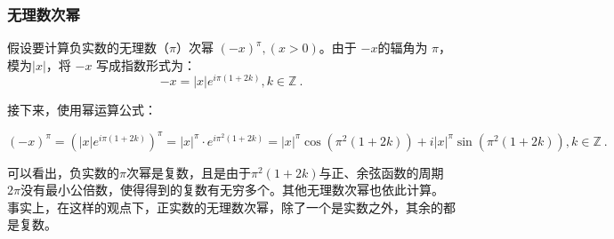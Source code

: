 \subsubsection{无理数次幂}

假设要计算负实数的无理数（$\pi$）次幂 $(-x)^\pi,(x>0)$。由于 $-x$的辐角为 $\pi$，模为$|x|$，将 $-x$ 写成指数形式为：
\begin{equation}
-x = |x| e^{i\pi(1+2k)},k\in\mathbb{Z}~.
\end{equation}

接下来，使用幂运算公式：

\begin{equation}
(-x)^\pi = \left( |x| e^{i\pi(1+2k)} \right)^\pi =|x|^\pi \cdot e^{i\pi^2(1+2k)}=|x|^\pi\cos(\pi^2(1+2k)) + i|x|^\pi\sin(\pi^2(1+2k)),k\in\mathbb{Z}~.
\end{equation}

可以看出，负实数的$\pi$次幂是复数，且是由于$\pi^2(1+2k)$与正、余弦函数的周期$2\pi$没有最小公倍数，使得得到的复数有无穷多个。其他无理数次幂也依此计算。事实上，在这样的观点下，正实数的无理数次幂，除了一个是实数之外，其余的都是复数。